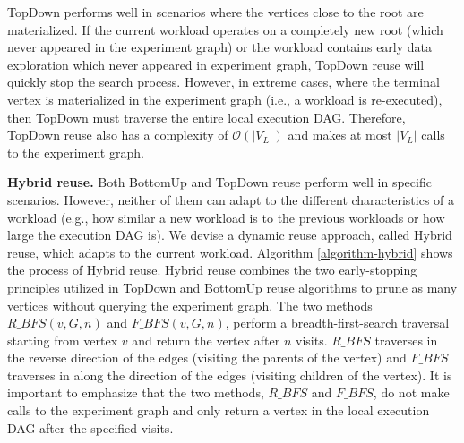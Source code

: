 TopDown performs well in scenarios where the vertices close to the root are materialized.
If the current workload operates on a completely new root (which never appeared in the experiment graph) or the workload contains early data exploration which never appeared in experiment graph, TopDown reuse will quickly stop the search process.
However, in extreme cases, where the terminal vertex is materialized in the experiment graph (i.e., a workload is re-executed), then TopDown must traverse the entire local execution DAG.
Therefore, TopDown reuse also has a complexity of $\mathcal{O}(|V_L|)$ and makes at most $|V_L|$ calls to the experiment graph.

\textbf{Hybrid reuse.}
Both BottomUp and TopDown reuse perform well in specific scenarios. 
However, neither of them can adapt to the different characteristics of a workload (e.g., how similar a new workload is to the previous workloads or how large the execution DAG is).
We devise a dynamic reuse approach, called Hybrid reuse, which adapts to the current workload.
Algorithm \ref{algorithm-hybrid} shows the process of Hybrid reuse.
Hybrid reuse combines the two early-stopping principles utilized in TopDown and BottomUp reuse algorithms to prune as many vertices without querying the experiment graph.
The two methods $R\_BFS(v, G, n)$ and $F\_BFS(v, G, n)$, perform a breadth-first-search traversal starting from vertex $v$ and return the vertex after $n$ visits.
$R\_BFS$ traverses in the reverse direction of the edges (visiting the parents of the vertex) and $F\_BFS$ traverses in along the direction of the edges (visiting children of the vertex).
It is important to emphasize that the two methods,  $R\_BFS$ and $F\_BFS$, do not make calls to the experiment graph and only return a vertex in the local execution DAG after the specified visits.

